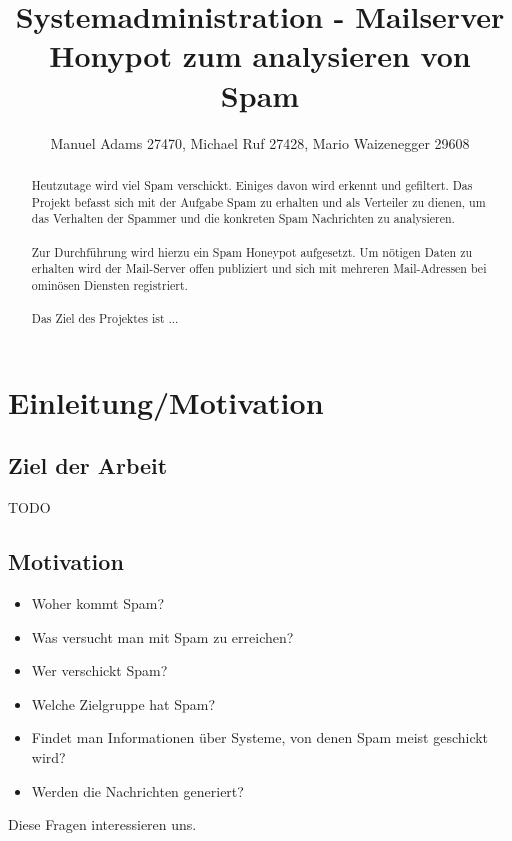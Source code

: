 \documentclass[a4paper,11pt,singlespacing]{article}
\begin{document}

\title{Systemadministration - Mailserver Honypot zum analysieren von Spam}
\author{Manuel Adams 27470, Michael Ruf 27428, Mario Waizenegger 29608}
\maketitle
\begin{abstract}
Heutzutage wird viel Spam verschickt. Einiges davon wird erkennt und gefiltert.
Das Projekt befasst sich mit der Aufgabe Spam zu erhalten und als Verteiler zu dienen, um das Verhalten der Spammer und die konkreten Spam Nachrichten zu analysieren.
\\\\
Zur Durchführung wird hierzu ein Spam Honeypot aufgesetzt.
Um nötigen Daten zu erhalten wird der Mail-Server offen publiziert und sich mit mehreren Mail-Adressen bei ominösen Diensten registriert.
\\\\
Das Ziel des Projektes ist ...\color{red}{TODO}
\end{abstract}

\newpage

\tableofcontents

\newpage
{}

\section{Einleitung/Motivation}\label{sec:Einleitung}

	\subsection{Ziel der Arbeit}\label{sec:Ziel}
		TODO

	\subsection{Motivation}\label{sec:Motivation}
		\begin{itemize}
		\item Woher kommt Spam?
		\item Was versucht man mit Spam zu erreichen?
		\item Wer verschickt Spam?
		\item Welche Zielgruppe hat Spam?
		\item Findet man Informationen über Systeme, von denen Spam meist geschickt wird?
		\item Werden die Nachrichten generiert?
		\end{itemize}
		Diese Fragen interessieren uns.
	
\end{document}
